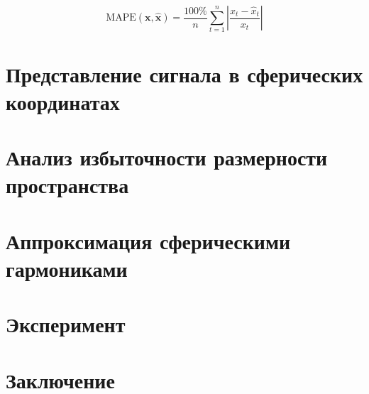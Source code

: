 \documentclass[12pt,twoside]{article}
\begin{document}
\begin{equation}
\textrm{MAPE}\mathbf{({x,\hat{x}})} =  \frac{100\%}{n}\sum_{t=1}^{n}\left |\frac{x_t - \hat{x}_t}{x_t}\right|
\label{eq:mape}
\end{equation}

\section{Представление сигнала в сферических координатах}
\section{Анализ избыточности размерности пространства}
\section{Аппроксимация сферическими гармониками}
\section{Эксперимент}
\section{Заключение}
\newpage


\end{document}
